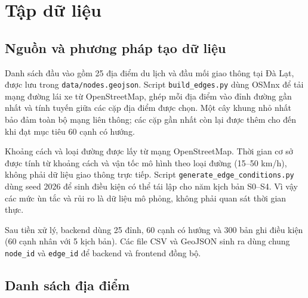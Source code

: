
\chapter{Tập dữ liệu}
\label{chap:dataset}

\section{Nguồn và phương pháp tạo dữ liệu}

Danh sách đầu vào gồm 25 địa điểm du lịch và đầu mối giao thông tại Đà Lạt,
được lưu trong \texttt{data/nodes.geojson}. Script \texttt{build\_edges.py}
dùng OSMnx để tải mạng đường lái xe từ OpenStreetMap, ghép mỗi địa điểm vào
đỉnh đường gần nhất và tính tuyến giữa các cặp địa điểm được chọn. Một cây
khung nhỏ nhất bảo đảm toàn bộ mạng liên thông; các cặp gần nhất còn lại được
thêm cho đến khi đạt mục tiêu 60 cạnh có hướng.

Khoảng cách và loại đường được lấy từ mạng OpenStreetMap. Thời gian cơ sở được
tính từ khoảng cách và vận tốc mô hình theo loại đường (15--50 km/h), không
phải dữ liệu giao thông trực tiếp. Script \texttt{generate\_edge\_conditions.py}
dùng seed 2026 để sinh điều kiện có thể tái lập cho năm kịch bản S0--S4. Vì vậy
các mức ùn tắc và rủi ro là dữ liệu mô phỏng, không phải quan sát thời gian thực.

Sau tiền xử lý, backend dùng 25 đỉnh, 60 cạnh có hướng và 300 bản ghi điều
kiện (60 cạnh nhân với 5 kịch bản). Các file CSV và GeoJSON sinh ra dùng chung
\texttt{node\_id} và \texttt{edge\_id} để backend và frontend đồng bộ.

\section{Danh sách địa điểm}

